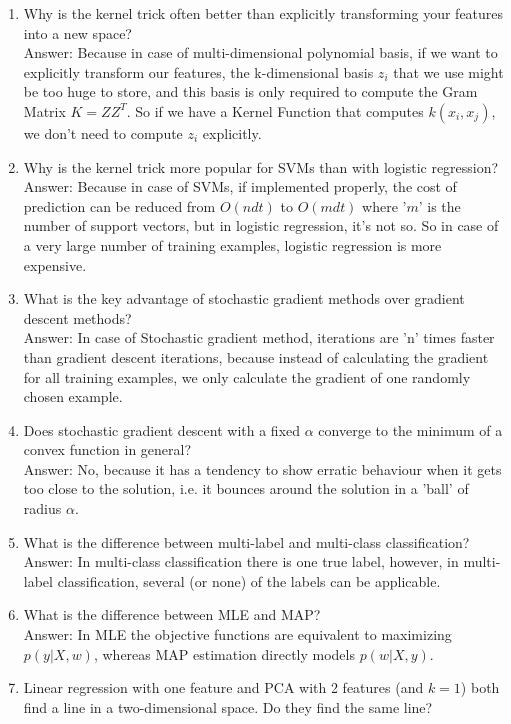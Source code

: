 \documentclass{article}
\def\gre#1{{\color{gre}#1}}
\def\enum#1{\begin{enumerate}#1\end{enumerate}}
\begin{document}
\enum{
\item Why is the kernel trick often better than explicitly transforming your features into a new space? \\
\gre{Answer: Because in case of multi-dimensional polynomial basis, if we want to explicitly transform our features, the k-dimensional basis $z_i$ that we use might be too huge to store, and this basis is only required to compute the Gram Matrix $K=ZZ^T$. So if we have a Kernel Function that computes $k(x_i, x_j)$, we don't need to compute $z_i$ explicitly.}
\item Why is the kernel trick more popular for SVMs than with logistic regression? \\
\gre{Answer: Because in case of SVMs, if implemented properly, the cost of prediction can be reduced from $O(ndt)$ to $O(mdt)$ where '$m$' is the number of support vectors, but in logistic regression, it's not so. So in case of a very large number of training examples, logistic regression is more expensive.}
\item What is the key advantage of stochastic gradient methods over gradient descent methods? \\
\gre{Answer: In case of Stochastic gradient method, iterations are 'n' times faster than gradient descent iterations, because instead of calculating the gradient for all training examples, we only calculate the gradient of one randomly chosen example.}
\item Does stochastic gradient descent with a fixed $\alpha$ converge to the minimum of a convex function in general? \\
\gre{Answer: No, because it has a tendency to show erratic behaviour when it gets too close to the solution, i.e. it bounces around the solution in a 'ball' of radius $\alpha$.}
\item What is the difference between multi-label and multi-class classification?\\
\gre{Answer: In multi-class classification there is one true label, however, in multi-label classification, several (or none) of the labels can be applicable.}
\item What is the difference between MLE and MAP? \\
\gre{Answer: In MLE the objective functions are equivalent to maximizing $p(y | X, w)$, whereas MAP estimation directly models $p(w | X, y)$.}
\item Linear regression with one feature and PCA with 2 features (and $k=1$) both find a line in a two-dimensional space. Do they find the same line?
}
\end{document}
